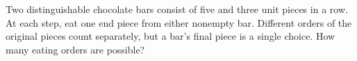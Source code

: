 Two distinguishable chocolate bars consist of five and three unit pieces in a row. At each step, eat one end piece from either nonempty bar. Different orders of the original pieces count separately, but a bar's final piece is a single choice. How many eating orders are possible?
